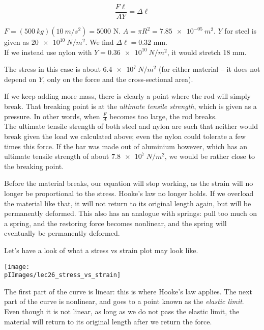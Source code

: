 \begin{equation}
\frac{F \ell}{A Y} = \Delta \ell
\end{equation}

$F = (\SI{500}{kg})(\SI{10}{m/s^2}) = 5000$ N. $A = \pi R^2 = \SI{7.85e-05}{m^2}$. $Y$ for steel is given as $\SI{20e10}{N/m^2}$. We find $\Delta \ell = 0.32$ mm.\\
If we instead use nylon with $Y = \SI{0.36e10}{N/m^2}$, it would stretch 18 mm.

The stress in this case is about $\SI{6.4e7}{N/m^2}$ (for either material -- it does not depend on $Y$, only on the force and the cross-sectional area).

If we keep adding more mass, there is clearly a point where the rod will simply break. That breaking point is at the \emph{ultimate tensile strength}, which is given as a pressure. In other words, when $\displaystyle \frac{F}{A}$ becomes too large, the rod breaks.\\
The ultimate tensile strength of both steel and nylon are such that neither would break given the load we calculated above; even the nylon could tolerate a few times this force. If the bar was made out of aluminium however, which has an ultimate tensile strength of about $\SI{7.8e7}{N/m^2}$, we would be rather close to the breaking point.

Before the material breaks, our equation will stop working, as the strain will no longer be proportional to the stress. Hooke's law no longer holds. If we overload the material like that, it will not return to its original length again, but will be permanently deformed. This also has an analogue with springs: pull too much on a spring, and the restoring force becomes nonlinear, and the spring will eventually be permanently deformed.

Let's have a look of what a stress vs strain plot may look like.

\begin{center}
\texttt{[image: \\pIImages/lec26\_stress\_vs\_strain]}
\end{center}

The first part of the curve is linear: this is where Hooke's law applies. The next part of the curve is nonlinear, and goes to a point known as the \emph{elastic limit}. Even though it is not linear, as long as we do not pass the elastic limit, the material will return to its original length after we return the force.

